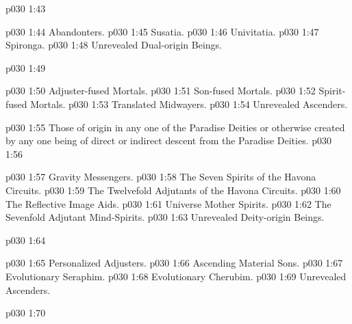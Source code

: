 \pc \vs p030 1:43 \bibnobreakspace {}
\begin{ubquote}
\pc \vs p030 1:44 \bibnobreakspace Abandonters.
\vs p030 1:45 \bibnobreakspace Susatia.
\vs p030 1:46 \bibnobreakspace Univitatia.
\vs p030 1:47 \bibnobreakspace Spironga.
\vs p030 1:48 \bibnobreakspace Unrevealed Dual\hyp{}origin Beings.
\end{ubquote}
\pc \vs p030 1:49 \bibnobreakspace {}
\begin{ubquote}
\pc \vs p030 1:50 \bibnobreakspace Adjuster\hyp{}fused Mortals.
\vs p030 1:51 \bibnobreakspace Son\hyp{}fused Mortals.
\vs p030 1:52 \bibnobreakspace Spirit\hyp{}fused Mortals.
\vs p030 1:53 \bibnobreakspace Translated Midwayers.
\vs p030 1:54 \bibnobreakspace Unrevealed Ascenders.
\end{ubquote}
\pc \vs p030 1:55 \bibnobreakspace {} Those of origin in any one of the Paradise Deities or otherwise created by any one being of direct or indirect descent from the Paradise Deities.
\pc \vs p030 1:56 \bibnobreakspace {}
\begin{ubquote}
\pc \vs p030 1:57 \bibnobreakspace Gravity Messengers.
\vs p030 1:58 \bibnobreakspace The Seven Spirits of the Havona Circuits.
\vs p030 1:59 \bibnobreakspace The Twelvefold Adjutants of the Havona Circuits.
\vs p030 1:60 \bibnobreakspace The Reflective Image Aids.
\vs p030 1:61 \bibnobreakspace Universe Mother Spirits.
\vs p030 1:62 \bibnobreakspace The Sevenfold Adjutant Mind\hyp{}Spirits.
\vs p030 1:63 \bibnobreakspace Unrevealed Deity\hyp{}origin Beings.
\end{ubquote}
\pc \vs p030 1:64 \bibnobreakspace {}
\begin{ubquote}
\pc \vs p030 1:65 \bibnobreakspace Personalized Adjusters.
\vs p030 1:66 \bibnobreakspace Ascending Material Sons.
\vs p030 1:67 \bibnobreakspace Evolutionary Seraphim.
\vs p030 1:68 \bibnobreakspace Evolutionary Cherubim.
\vs p030 1:69 \bibnobreakspace Unrevealed Ascenders.
\end{ubquote}
\pc \vs p030 1:70 \bibnobreakspace {}
